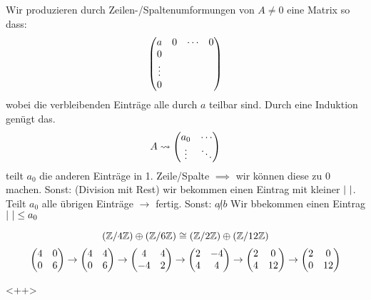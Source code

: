 \begin{Bew}
  Wir produzieren durch Zeilen-/Spaltenumformungen von $A\neq 0$ eine Matrix so dass:
  \[\begin{pmatrix}a&0&\cdots&0\\0\\\vdots\\0\\\end{pmatrix}\]
  wobei die verbleibenden Einträge alle durch $a$ teilbar sind. Durch eine Induktion genügt das.
  \[A\rightsquigarrow \begin{pmatrix}a_0&\cdots\\\vdots&\ddots\end{pmatrix}\]
  teilt $a_0$ die anderen Einträge in 1. Zeile/Spalte $\implies$ wir können diese zu 0 machen. Sonst: (Division mit Rest) wir bekommen einen Eintrag mit kleiner $\left| \  \right|$. Teilt $a_0$ alle übrigen Einträge $\to$ fertig. Sonst: $a\not|b$ Wir bbekommen einen Eintrag $\left| \  \right|\leq a_0$
\end{Bew}
\begin{Bsp}
  \[\left( \mathbb{Z}/4\mathbb{Z} \right)\oplus\left( \mathbb{Z}/6\mathbb{Z} \right)\cong\left( \mathbb{Z}/2\mathbb{Z} \right)\oplus \left( \mathbb{Z}/12\mathbb{Z} \right)\]
  \[\begin{pmatrix}4&0\\0&6\end{pmatrix}\to\begin{pmatrix}4&4\\0&6\end{pmatrix}\to\begin{pmatrix}4&4\\-4&2\end{pmatrix}\to\begin{pmatrix}2&-4\\4&4\end{pmatrix}\to\begin{pmatrix}2&0\\4&12\end{pmatrix}\to\begin{pmatrix}2&0\\0&12\end{pmatrix}\]
\end{Bsp}<++>
